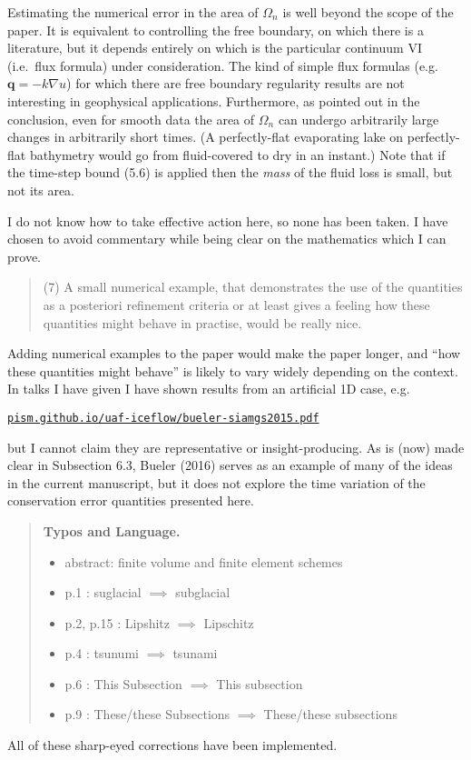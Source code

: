 \documentclass[12pt]{amsart}
\newcommand{\mm}{\medskip \noindent}
\begin{document}
Estimating the numerical error in the area of $\Omega_n$ is well beyond the scope of the paper.  It is equivalent to controlling the free boundary, on which there is a literature, but it depends entirely on which is the particular continuum VI (i.e.~flux formula) under consideration.  The kind of simple flux formulas (e.g.~$\mathbf{q} = -k\nabla u$) for which there are free boundary regularity results are not interesting in geophysical applications.  Furthermore, as pointed out in the conclusion, even for smooth data the area of $\Omega_n$ can undergo arbitrarily large changes in arbitrarily short times.  (A perfectly-flat evaporating lake on perfectly-flat bathymetry would go from fluid-covered to dry in an instant.)  Note that if the time-step bound (5.6) is applied then the \emph{mass} of the fluid loss is small, but not its area.

I do not know how to take effective action here, so none has been taken.  I have chosen to avoid commentary while being clear on the mathematics which I can prove.

\begin{quote}
\mm (7) A small numerical example, that demonstrates the use of the quantities as a posteriori refinement criteria or at least gives a feeling how these quantities might behave in practise, would be really nice.
\end{quote}

Adding numerical examples to the paper would make the paper longer, and ``how these quantities might behave'' is likely to vary widely depending on the context.  In talks I have given I have shown results from an artificial 1D case, e.g.

\href{http://pism.github.io/uaf-iceflow/bueler-siamgs2015.pdf}{\texttt{pism.github.io/uaf-iceflow/bueler-siamgs2015.pdf}}

\noindent but I cannot claim they are representative or insight-producing.  As is (now) made clear in Subsection 6.3, Bueler (2016) serves as an example of many of the ideas in the current manuscript, but it does not explore the time variation of the conservation error quantities presented here.

\begin{quote}
\textbf{Typos and Language.}

\begin{itemize}
\item abstract: finite volume and finite element schemes
\item p.1 : suglacial $\implies$ subglacial
\item p.2, p.15 : Lipshitz $\implies$ Lipschitz
\item p.4 : tsunumi $\implies$ tsunami
\item p.6 : This Subsection $\implies$ This subsection
\item p.9 : These/these Subsections $\implies$ These/these subsections
\end{itemize}
\end{quote}

All of these sharp-eyed corrections have been implemented.
\end{document}
